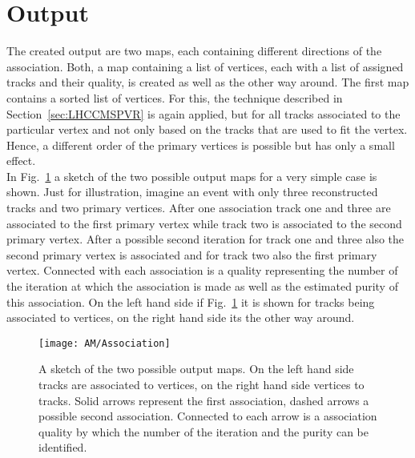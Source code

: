 \section{Output\label{sec:AMOutput}}

The created output are two maps, each containing different directions of the association. Both, a map containing a list of vertices, each with a list of assigned tracks and their quality, is created as well as the other way around. The first map contains a sorted list of vertices. For this, the technique described in Section~\ref{sec:LHCCMSPVR} is again applied, but for all tracks associated to the particular vertex and not only based on the tracks that are used to fit the vertex. Hence, a different order of the primary vertices is possible but has only a small effect.\\
In Fig.~\ref{plot:AMOutput} a sketch of the two possible output maps for a very simple case is shown. Just for illustration, imagine an event with only three reconstructed tracks and two primary vertices. After one association track one and three are associated to the first primary vertex while track two is associated to the second primary vertex. After a possible second iteration for track one and three also the second primary vertex is associated and for track two also the first primary vertex. Connected with each association is a quality representing the number of the iteration at which the association is made as well as the estimated purity of this association. On the left hand side if Fig.~\ref{plot:AMOutput} it is shown for tracks being associated to vertices, on the right hand side its the other way around.

\begin{figure}[!ht]
    \centering
    \texttt{[image: AM/Association]}
    \caption[Sketch of the two different output maps]{A sketch of the two possible output maps. On the left hand side tracks are associated to vertices, on the right hand side vertices to tracks. Solid arrows represent the first association, dashed arrows a possible second association. Connected to each arrow is a association quality by which the number of the iteration and the purity can be identified. \label{plot:AMOutput}}
\end{figure}
